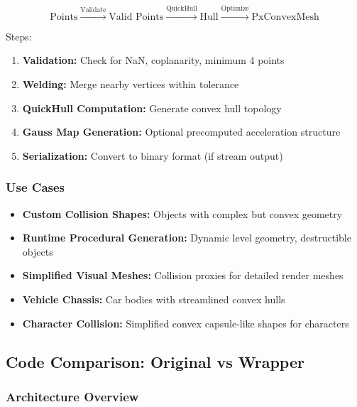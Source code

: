 \begin{equation}
\text{Points} \xrightarrow{\text{Validate}} \text{Valid Points} \xrightarrow{\text{QuickHull}} \text{Hull} \xrightarrow{\text{Optimize}} \text{PxConvexMesh}
\end{equation}

Steps:
\begin{enumerate}
    \item \textbf{Validation:} Check for NaN, coplanarity, minimum 4 points
    \item \textbf{Welding:} Merge nearby vertices within tolerance
    \item \textbf{QuickHull Computation:} Generate convex hull topology
    \item \textbf{Gauss Map Generation:} Optional precomputed acceleration structure
    \item \textbf{Serialization:} Convert to binary format (if stream output)
\end{enumerate}

\subsubsection{Use Cases}

\begin{itemize}
    \item \textbf{Custom Collision Shapes:} Objects with complex but convex geometry
    \item \textbf{Runtime Procedural Generation:} Dynamic level geometry, destructible objects
    \item \textbf{Simplified Visual Meshes:} Collision proxies for detailed render meshes
    \item \textbf{Vehicle Chassis:} Car bodies with streamlined convex hulls
    \item \textbf{Character Collision:} Simplified convex capsule-like shapes for characters
\end{itemize}


\subsection{Code Comparison: Original vs Wrapper}

\subsubsection{Architecture Overview}

